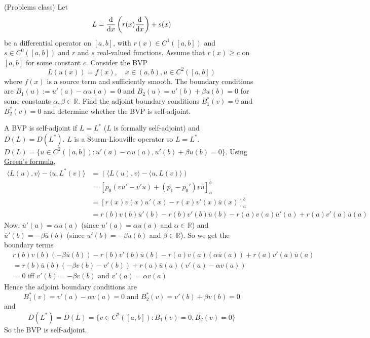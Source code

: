 \begin{example}
	(Problems class) Let
	\[
		L = \diff{}{x} \left( r(x) \diff{}{x} \right) + s(x)
	\]
	be a differential operator on $[a, b]$, with $r(x) \in C^1 ([a, b])$ and $s \in C^0 ([a, b])$ and $r$ and $s$ real-valued functions. Assume that $r(x) \ge c$ on $[a, b]$ for some constant $c$. Consider the BVP
	\[
		L(u(x)) = f(x), \quad x \in (a, b), u \in C^2 ([a, b])
	\]
	where $f(x)$ is a source term and sufficiently smooth. The boundary conditions are $B_1(u) := u'(a) - \alpha u(a) = 0$ and $B_2(u) = u'(b) + \beta u(b) = 0$ for some constants $\alpha, \beta \in \mathbb{R}$. Find the adjoint boundary conditions $B_1^*(v) = 0$ and $B_2^*(v) = 0$ and determine whether the BVP is self-adjoint.

	A BVP is self-adjoint if $L = L^*$ ($L$ is formally self-adjoint) and $D(L) = D(L^*)$. $L$ is a Sturm-Liouville operator so $L = L^*$. $D(L) = \{ u \in C^2 ([a, b]): u'(a) - \alpha u(a), u'(b) + \beta u(b) = 0 \}$. Using \hyperref[prop:greensFormula]{Green's formula},
	\[
		\begin{aligned}
			\langle L(u), v \rangle - \langle u, L^*(v) \rangle
				& = (\langle L(u), v \rangle - \langle u, L(v) \rangle) \\
				& = {\left[ \overline{p_0} (v \overline{u}' - v' \overline{u}) + (\overline{p_1} - \overline{p_0}') v \overline{u} \right]}_a^b \\
				& = \left[ r(x) v(x) u'(x) - r(x) v'(x) \overline{u}(x) \right]_a^b \\
				& = r(b) v(b) \overline{u}'(b) - r(b) v'(b) \overline{u}(b) - r(a) v(a) \overline{u}'(a) + r(a) v'(a) \overline{u}(a)
		\end{aligned}
	\]
	Now, $\overline{u}'(a) = \alpha \overline{u}(a)$ (since $u'(a) = \alpha u(a)$ and $\alpha \in \mathbb{R}$) and $\overline{u}'(b) = -\beta \overline{u}(b)$ (since $u'(b) = -\beta u(b)$ and $\beta \in \mathbb{R}$). So we get the boundary terms
	\[
		\begin{aligned}
			& r(b) v(b) (-\beta \overline{u}(b)) - r(b) v'(b) \overline{u}(b) - r(a) v(a) (\alpha \overline{u}(a)) + r(a) v'(a) \overline{u}(a) \\
			& = r(b) \overline{u}(b) (-\beta v(b) - v'(b)) + r(a) \overline{u}(a) (v'(a) - \alpha v(a)) \\
			& = 0 \text{ iff } v'(b) = -\beta v(b) \text{ and } v'(a) = \alpha v(a)
		\end{aligned}
	\]
	Hence the adjoint boundary conditions are
	\[
		B_1^*(v) = v'(a) - \alpha v(a) = 0 \text{ and } B_2^*(v) = v'(b) + \beta v(b) = 0
	\]
	and
	\[
		D(L^*) = D(L) = \{ v \in C^2 ([a, b]): B_1(v) = 0, B_2(v) = 0 \}
	\]
	So the BVP is self-adjoint.
\end{example}

